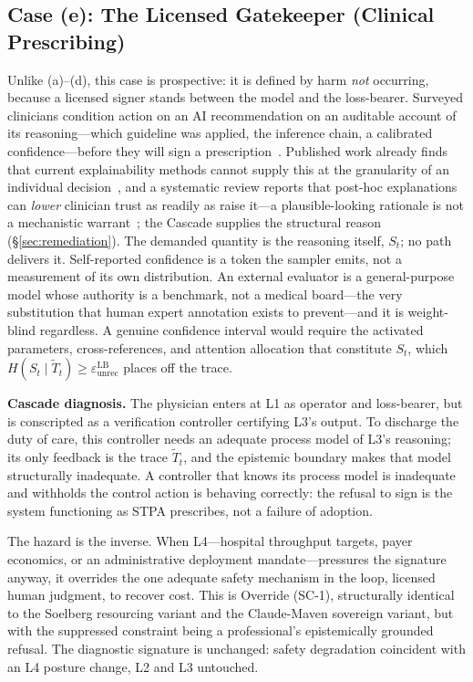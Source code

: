 \subsection{Case (e): The Licensed Gatekeeper (Clinical Prescribing)}

Unlike (a)--(d), this case is prospective: it is defined by harm \emph{not} occurring, because a licensed signer stands between the model and the loss-bearer. Surveyed clinicians condition action on an AI recommendation on an auditable account of its reasoning---which guideline was applied, the inference chain, a calibrated confidence---before they will sign a prescription~\cite{tonekaboni2019, amann2020}. Published work already finds that current explainability methods cannot supply this at the granularity of an individual decision~\cite{ghassemi2021}, and a systematic review reports that post-hoc explanations can \emph{lower} clinician trust as readily as raise it---a plausible-looking rationale is not a mechanistic warrant~\cite{rosenbacke2024}; the Cascade supplies the structural reason (\S\ref{sec:remediation}). The demanded quantity is the reasoning itself, $S_t$; no path delivers it. Self-reported confidence is a token the sampler emits, not a measurement of its own distribution. An external evaluator is a general-purpose model whose authority is a benchmark, not a medical board---the very substitution that human expert annotation exists to prevent---and it is weight-blind regardless. A genuine confidence interval would require the activated parameters, cross-references, and attention allocation that constitute $S_t$, which $H(S_t\mid\tilde T_t)\ge\varepsilon_{\mathrm{unrec}}^{\mathrm{LB}}$ places off the trace.

\textbf{Cascade diagnosis.} The physician enters at L1 as operator and loss-bearer, but is conscripted as a verification controller certifying L3's output. To discharge the duty of care, this controller needs an adequate process model of L3's reasoning; its only feedback is the trace $\tilde T_t$, and the epistemic boundary makes that model structurally inadequate. A controller that knows its process model is inadequate and withholds the control action is behaving correctly: the refusal to sign is the system functioning as STPA prescribes, not a failure of adoption.

The hazard is the inverse. When L4---hospital throughput targets, payer economics, or an administrative deployment mandate---pressures the signature anyway, it overrides the one adequate safety mechanism in the loop, licensed human judgment, to recover cost. This is Override (SC-1), structurally identical to the Soelberg resourcing variant and the Claude-Maven sovereign variant, but with the suppressed constraint being a professional's epistemically grounded refusal. The diagnostic signature is unchanged: safety degradation coincident with an L4 posture change, L2 and L3 untouched.

